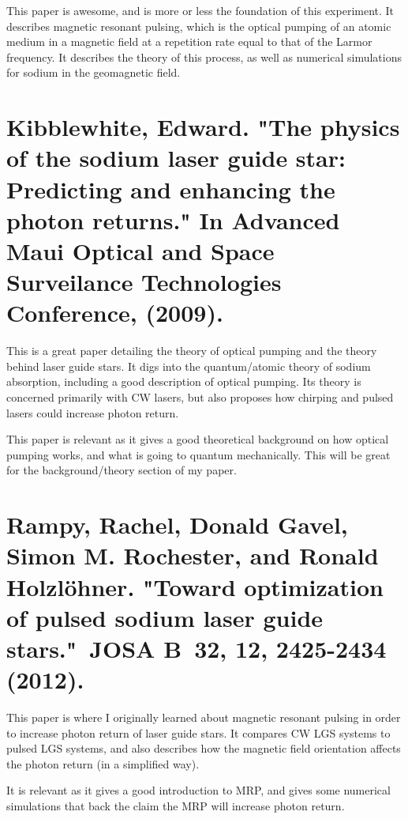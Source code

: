\documentclass{article}
\begin{document}
This paper is awesome, and is more or less the foundation of this experiment. It describes magnetic resonant pulsing, which is the optical pumping of an atomic medium in a magnetic field at a repetition rate equal to that of the Larmor frequency. It describes the theory of this process, as well as numerical simulations for sodium in the geomagnetic field.

%


\section*{Kibblewhite, Edward. "The physics of the sodium laser guide star: Predicting and enhancing the photon returns." In Advanced Maui Optical and Space Surveilance Technologies Conference, (2009).}

This is a great paper detailing the theory of optical pumping and the theory behind laser guide stars. It digs into the quantum/atomic theory of sodium absorption, including a good description of optical pumping. Its theory is concerned primarily with CW lasers, but also proposes how chirping and pulsed lasers could increase photon return.

This paper is relevant as it gives a good theoretical background on how optical pumping works, and what is going to quantum mechanically. This will be great for the background/theory section of my paper.


%

\section*{Rampy, Rachel, Donald Gavel, Simon M. Rochester, and Ronald Holzlöhner. "Toward optimization of pulsed sodium laser guide stars." JOSA B 32, 12,  2425-2434 (2012).}

This paper is where I originally learned about magnetic resonant pulsing in order to increase photon return of laser guide stars. It compares CW LGS systems to pulsed LGS systems, and also describes how the magnetic field orientation affects the photon return (in a simplified way).

It is relevant as it gives a good introduction to MRP, and gives some numerical simulations that back the claim the MRP will increase photon return.

%
\end{document}
